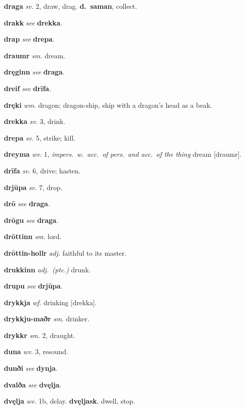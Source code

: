 \documentclass[12pt,letterpaper]{book}
\begin{document}
\noindent
\textbf{draga} \textit{sv.} 2, draw, drag.  \textbf{d.\ saman}, collect.

\noindent
\textbf{drakk} \textit{} \textit{see} \textbf{drekka}.

\noindent
\textbf{drap} \textit{} \textit{see} \textbf{drepa}.

\noindent
\textbf{draumr} \textit{sm.} dream.

\noindent
\textbf{dręginn} \textit{} \textit{see} \textbf{draga}.

\noindent
\textbf{dreif} \textit{} \textit{see} \textbf{drīfa}.

\noindent
\textbf{dręki} \textit{wm.} dragon; dragon-ship, ship with a dragon's head
	as a beak.

\noindent
\textbf{drekka} \textit{sv.} 3, drink.

\noindent
\textbf{drepa} \textit{sv.} 5, strike; kill.

\noindent
\textbf{dreyma} \textit{wv.} 1, \textit{impers.\ w.\ acc.\ of pers.\ and acc.\ of the
	thing} dream [draumr].

\noindent
\textbf{drīfa} \textit{sv.} 6, drive; hasten.

\noindent
\textbf{drjūpa} \textit{sv.} 7, drop.

\noindent
\textbf{drō} \textit{} \textit{see} \textbf{draga}.

\noindent
\textbf{drōgu} \textit{} \textit{see} \textbf{draga}.

\noindent
\textbf{drōttinn} \textit{sm.} lord.

\noindent
\textbf{drōttin-hollr} \textit{adj.} faithful to its master.

\noindent
\textbf{drukkinn} \textit{adj.\ (ptc.)} drunk.

\noindent
\textbf{drupu} \textit{} \textit{see} \textbf{drjūpa}.

\noindent
\textbf{drykkja} \textit{wf.} drinking [drekka].

\noindent
\textbf{drykkju-maðr} \textit{sm.} drinker.

\noindent
\textbf{drykkr} \textit{sm.} 2, draught.

\noindent
\textbf{duna} \textit{wv.} 3, resound.

\noindent
\textbf{dunði} \textit{} \textit{see} \textbf{dynja}.

\noindent
\textbf{dvalða} \textit{} \textit{see} \textbf{dvęlja}.

\noindent
\textbf{dvęlja} \textit{wv.} 1b, delay.  \textbf{dvęljask}, dwell, stop.
\end{document}
